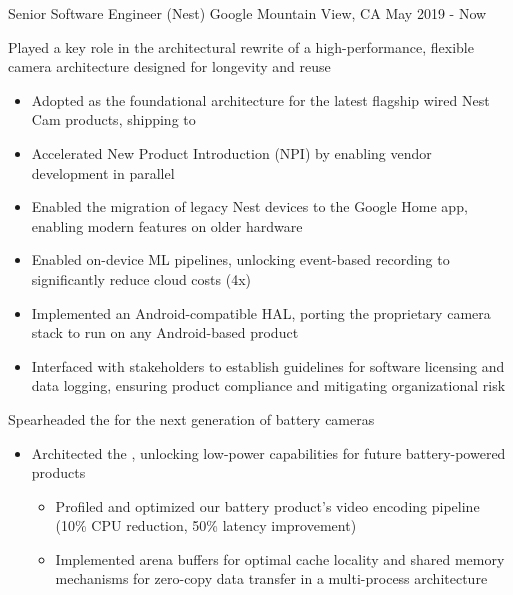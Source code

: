 \begin{cventries}

\cventry
{Senior Software Engineer (Nest)} %
{Google} %
{Mountain View, CA} %
{May 2019 - Now} %
{ %
\begin{cvitems}
\item {Played a key role in the architectural rewrite of a high-performance, flexible camera architecture designed for longevity and reuse}
  \begin{itemize}
    \item {Adopted as the foundational architecture for the latest flagship wired Nest Cam products, shipping to }
    \item {Accelerated New Product Introduction (NPI) by enabling vendor development in parallel}
    \item {Enabled the migration of legacy Nest devices to the Google Home app, enabling modern features on older hardware}
    \item {Enabled on-device ML pipelines, unlocking event-based recording to significantly reduce cloud costs (4x)}
    \item {Implemented an Android-compatible HAL, porting the proprietary camera stack to run on any Android-based product}
    \item {Interfaced with  stakeholders to establish guidelines for software licensing and data logging, ensuring product compliance and mitigating organizational risk}
  \end{itemize}
\item {Spearheaded the  for the next generation of battery cameras}
  \begin{itemize}
    \item {Architected the , unlocking low-power capabilities for future battery-powered products}
      \begin{itemize}
        \item {Profiled and optimized our battery product's video encoding pipeline (10\% CPU reduction, 50\% latency improvement)}
        \item {Implemented arena buffers for optimal cache locality and shared memory mechanisms for zero-copy data transfer in a multi-process architecture}

\end{itemize}
\end{itemize}
\end{cvitems}}
\end{cventries}
